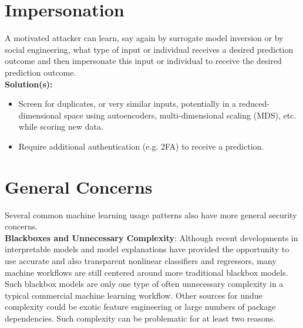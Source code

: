 \documentclass[fleqn]{article}
\begin{document}
\section{Impersonation} \label{sec:impersonation}

A motivated attacker can learn, say again by surrogate model inversion or by social engineering, what type of input or individual receives a desired prediction outcome and then impersonate this input or individual to receive the desired prediction outcome. \\

\noindent\textbf{Solution(s):} 
\begin{itemize}
\item Screen for duplicates, or very similar inputs, potentially in a reduced-dimensional space using autoencoders, multi-dimensional scaling (MDS), etc. while scoring new data.
\item Require additional authentication (e.g. 2FA) to receive a prediction.
\end{itemize}

\section{General Concerns}

Several common machine learning usage patterns also have more general security concerns.\\

\noindent\textbf{Blackboxes and Unnecessary Complexity}: Although recent developments in interpretable models and model explanations have provided the opportunity to use accurate and also transparent nonlinear classifiers and regressors, many machine workflows are still centered around more traditional blackbox models. Such blackbox models are only one type of often unnecessary complexity in a typical commercial machine learning workflow. Other sources for undue complexity could be exotic feature engineering or large numbers of package dependencies. Such complexity can be problematic for at least two reasons. 
\end{document}
